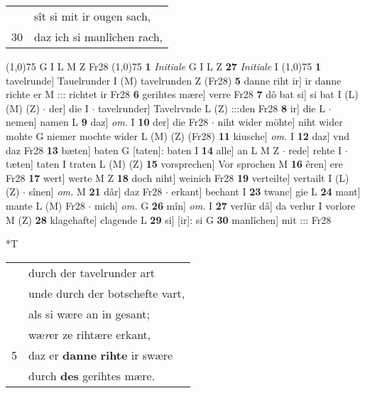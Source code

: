 \documentclass[8pt,a4paper,notitlepage]{article}
\begin{document}
\begin{table}[ht]
\begin{minipage}[t]{0.5\linewidth}
\begin{tabular}{rl}
 & sît si mit ir ougen sach,\\ 
30 & daz ich si manlîchen rach,\\ 
\end{tabular}
\scriptsize
\line(1,0){75} \newline
G I L M Z Fr28 \newline
\line(1,0){75} \newline
\textbf{1} \textit{Initiale} G I L Z  \textbf{27} \textit{Initiale} I  \newline
\line(1,0){75} \newline
\textbf{1} tavelrunde] Tauelrunder I (M) tavelrunden Z (Fr28) \textbf{5} danne riht ir] ir danne richte er M ::: richtet ir Fr28 \textbf{6} gerihtes mære] verre Fr28 \textbf{7} dô bat si] si bat I (L) (M) (Z)  $\cdot$ der] die I  $\cdot$ tavelrunder] Tavelrvnde L (Z) :::den Fr28 \textbf{8} ir] die L  $\cdot$ nemen] namen L \textbf{9} daz] \textit{om.} I \textbf{10} der] die Fr28  $\cdot$ niht wider möhte] niht wider mohte G niemer mochte wider L (M) (Z) (Fr28) \textbf{11} kiusche] \textit{om.} I \textbf{12} daz] vnd daz Fr28 \textbf{13} bæten] baten G [taten]: baten I \textbf{14} alle] an L M Z  $\cdot$ rede] rehte I  $\cdot$ tæten] taten I traten L (M) (Z) \textbf{15} vorsprechen] Vor sprochen M \textbf{16} êren] ere Fr28 \textbf{17} wert] werte M Z \textbf{18} doch niht] weinich Fr28 \textbf{19} verteilte] vertailt I (L) (Z)  $\cdot$ sînen] \textit{om.} M \textbf{21} dâr] daz Fr28  $\cdot$ erkant] bechant I \textbf{23} twanc] gie L \textbf{24} mant] mante L (M) Fr28  $\cdot$ mich] \textit{om.} G \textbf{26} mîn] \textit{om.} I \textbf{27} verlür dâ] da verlur I vorlore M (Z) \textbf{28} klagehafte] clagende L \textbf{29} si] [ir]: si G \textbf{30} manlîchen] mit ::: Fr28 \newline
\end{minipage}
\hspace{0.5cm}
\begin{minipage}[t]{0.5\linewidth}
\small
\begin{center}*T
\end{center}
\begin{tabular}{rl}
 & durch der tavelrunder art\\ 
 & unde durch der botschefte vart,\\ 
 & als si wære an in gesant;\\ 
 & wæ\textit{r}er ze rihtære erkant,\\ 
5 & daz er \textbf{danne} \textbf{rihte} ir swære\\ 
 & durch \textbf{des} gerihtes mære.\\ 

\end{tabular}
\end{minipage}
\end{table}
\end{document}
